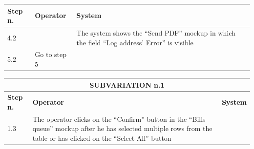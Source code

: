 {{{\begin{table}[h]
\begin{tabular}{|p{2cm}|p{6cm}|p{6cm}|}
			\hline
				\centering \vspace{1mm} \bfseries{Step n.} \vspace{1mm} & \vspace{1mm} \bfseries{Operator} \vspace{1mm} & \vspace{1mm} \bfseries{System} \vspace{1mm}\\
			\hline
				\vspace{1mm} 4.2 \vspace{1mm} &
				\vspace{1mm} \vspace{1mm} & 
				\vspace{1mm} The system shows the “Send PDF” mockup in which the field “Log address’ Error” is visible\vspace{1mm} \\
			\hline
				\vspace{1mm} 5.2 \vspace{1mm} &
				\vspace{1mm} Go to step 5\vspace{1mm} & 
				\vspace{1mm} \vspace{1mm} \\
			\hline
			\end{tabular}
			\end{table}
			\begin{table}[h]
			\begin{tabular}{|p{2cm}|p{6cm}|p{6cm}|}
			\hline
				\multicolumn{3}{|c|}{SUBVARIATION n.1}\\
			\hline
				\centering \vspace{1mm} \bfseries{Step n.} \vspace{1mm} & \vspace{1mm} \bfseries{Operator} \vspace{1mm} & \vspace{1mm} \bfseries{System} \vspace{1mm}\\
			\hline
				\vspace{1mm} 1.3\vspace{1mm} &
				\vspace{1mm} The operator clicks on the “Confirm” button in the “Bills queue” mockup after he has selected multiple rows from the table or has clicked on the “Select All” button\vspace{1mm} & 
				\vspace{1mm} \vspace{1mm} \\

\end{tabular}
\end{table}}}}
